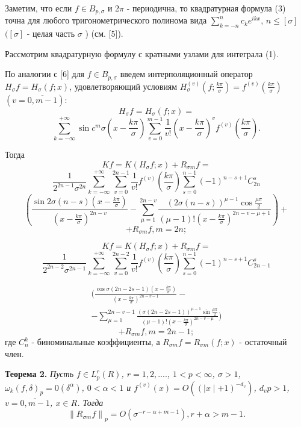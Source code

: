 Заметим, что если $f \in B_{p, \sigma}$ и 2$\pi$ - периодична, то квадратурная формула (3) точна для любого тригонометрического полинома вида $\sum_{k=-n}^{n} c_k e^{i k x}$, $n \leq [\sigma]$ $([\sigma]$ - целая часть $\sigma$ ) (см. [5]).

Рассмотрим квадратурную формулу с кратными узлами для интеграла (1).

По аналогии с [6] для $f \in B_{p,\sigma}$ введем интерполяционный оператор $H_\sigma f = H_\sigma (f;x)$, удовлетворяющий условиям $H_{\sigma} ^{(v)} \left(f ; \frac{k \pi}{\sigma}\right) = f^{(v)} \left(\frac{k\pi}{\sigma}\right)$ $(v = \overline{0, m-1})$:
$$ H_\sigma f = H_\sigma \left(f;x\right) = $$
$$\sum_{k=-\infty}^{+\infty} \sin{c^m \sigma} \left( x - \frac{k \pi}{\sigma} \right) \sum_{v=0}^{m-1} \frac{1}{v!} \left(x - \frac{k\pi}{\sigma} \right)^v f^{(v)} \left( \frac{k \pi}{\sigma}\right). $$

Тогда $$ Kf = K \left(H_\sigma f;x \right) + R_{\sigma m}f =$$
$$ \frac{1}{2^{2n-1}\sigma^{2n}} \sum_{k=-\infty}^{+\infty} \sum_{v=0}^{2n-1} \frac{1}{v!} f^{(v)} \left(\frac{k \pi}{\sigma}\right) \sum_{s=0}^{n-1} \left(-1 \right)^{n-s+1} C_{2n}^s $$
$$\left( \frac{\sin{2\sigma}(n-s) \left(x-\frac{k \pi}{\sigma}
\right)}{\left(x-\frac{k \pi}{\sigma}\right)^{2n-v}}
- \sum_{\mu = 1}^{2n-v} \frac{\left(2 \sigma (n-s) \right)^{\mu-1} \cos{\frac{\mu \pi }{2}}}{(\mu - 1)! \left(x - \frac{k \pi}{\sigma}\right)^{2n-v-\mu+1}} \right) + $$
$$ + R_{\sigma m} f, m = 2n;$$

$$ Kf = K \left(H_\sigma f;x \right) + R_{\sigma m}f = $$
$$ \frac{1}{2^{2n-2}\sigma^{2n-1}} \sum_{k=-\infty}^{+\infty} \sum_{v=0}^{2n-2} \frac{1}{v!} f^{(v)} \left(\frac{k \pi}{\sigma}\right) \sum_{s=0}^{n-1} \left(-1 \right)^{n-s+1} C_{2n-1}^s  $$

\begin{equation*}
    \begin{gathered}
        \bigg( \frac{\cos{\sigma}(2n-2s-1) \left(x-\frac{k \pi}{\sigma}\right)}{\left(x-\frac{k \pi}{\sigma}\right)^{2n-v-1}} - \\
        - \sum_{\mu = 1}^{2n-v-1} \frac{\left(\sigma (2n-2s-1) \right)^{\mu-1} \sin{\frac{\mu \pi }{2}}}{(\mu - 1)! \left(x - \frac{k \pi}{\sigma}\right)^{2n-v-\mu}} \bigg)
    \end{gathered}
\end{equation*}
$$ + R_{\sigma m} f, m = 2n-1;$$
где $C_n^k$ - биноминальные коэффициенты, а $R_{\sigma m} f = R_{\sigma m}(f;x)$ - остаточный член.

\textbf{Теорема 2.} \textit{Пусть $f \in L_p^r (R)$, $r =1, 2, ....$, $1 < p < \infty$, $\sigma > 1$, $\omega_k (f, \delta)_p = 0(\delta^{\alpha})$, $0 < \alpha < 1$ и $f^{(v)}(x) = O\left((\mid x \mid +1)^{-d_v}\right)$, $d_v p > 1$, $v = \overline{0, m-1}$, $x \in R$. Тогда}
$$ {\|R_{\sigma m} f \|}_{p} = O\left(\sigma^{-r-\alpha+m-1}\right), r+\alpha > m-1. $$

